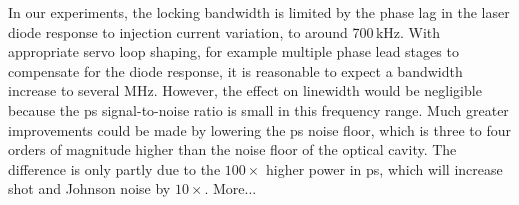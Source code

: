 In our experiments, the locking bandwidth is limited by the phase lag in the laser diode response to injection current variation, to around 700\,kHz.  With appropriate servo loop shaping, for example multiple phase lead stages to compensate for the diode response, it is reasonable to expect a bandwidth increase to several MHz. However, the effect on linewidth would be negligible because the \gls*{ps} signal-to-noise ratio is small in this frequency range.  Much greater improvements could be made by lowering the \gls*{ps} noise floor, which is three to four orders of magnitude higher than the noise floor of the optical cavity.  The difference is only partly due to the $100\times$ higher power in \gls*{ps}, which will increase shot and Johnson noise by $10\times$.  More...
